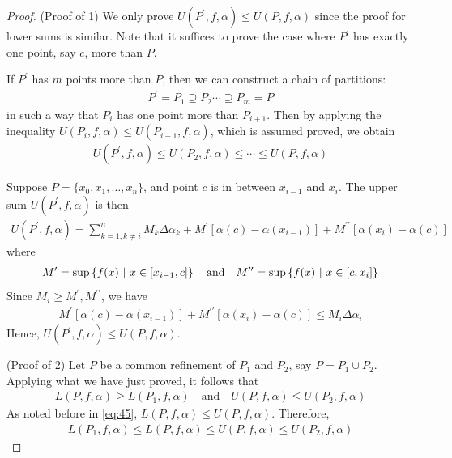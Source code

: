 \documentclass[thmcnt=section, 12pt]{my-elegantbook}
\begin{document}
\begin{proof}
    (Proof of 1) We only prove $U(P^\prime,f,\alpha) \leq U(P,f,\alpha)$ since the proof for lower sums is similar. Note that it suffices to prove the case where $P^\prime$ has exactly one point, say $c$, more than $P$.
    \begin{note}
        If $P^\prime$ has $m$ points more than $P$, then we can construct a chain of partitions:
        \begin{align*}
            P^\prime = P_1 \supseteq P_2 \cdots \supseteq P_m = P
        \end{align*}
        in such a way that $P_i$ has one point more than $P_{i+1}$. Then by applying the inequality $U(P_i,f,\alpha) \leq U(P_{i+1},f,\alpha)$, which is assumed proved, we obtain
        \begin{align*}
            U(P^\prime,f,\alpha) \leq U(P_2,f,\alpha) \leq \cdots \leq U(P,f,\alpha)
        \end{align*}
    \end{note}
    Suppose $P=\{x_0,x_1,\ldots,x_n\}$, and point $c$ is in between $x_{i-1}$ and $x_i$. The upper sum $U(P^\prime,f,\alpha)$ is then
    \begin{align*}
        U(P^\prime,f,\alpha)
        = \sum_{k=1, k \neq i}^n M_k \Delta \alpha_k
        + M^\prime[\alpha(c) - \alpha(x_{i-1})]
        + M^{\prime\prime}[\alpha(x_{i})-\alpha(c)]
    \end{align*}
    where
    \begin{align*}
        M^\prime = \sup\left\{ f(x) \ \middle| \ x \in [x_{i-1}, c] \right\}
        \quad\text{and}\quad
        M^{\prime\prime} = \sup\left\{ f(x) \ \middle| \ x \in [c, x_i] \right\}
    \end{align*}
    Since $M_i \geq M^\prime, M^{\prime\prime}$, we have
    \begin{align*}
        M^\prime[\alpha(c) - \alpha(x_{i-1})]
        + M^{\prime\prime}[\alpha(x_{i})-\alpha(c)]
        \leq M_i \Delta \alpha_i
    \end{align*}
    Hence, $U(P^\prime,f,\alpha) \leq U(P,f,\alpha)$.

    (Proof of 2) Let $P$ be a common refinement of $P_1$ and $P_2$, say $P = P_1 \cup P_2$. Applying what we have just proved, it follows that
    \begin{align*}
        L(P,f,\alpha) \geq L(P_1,f,\alpha)
        \quad \text{and} \quad
        U(P,f,\alpha) \leq U(P_2,f,\alpha)
    \end{align*}
    As noted before in \eqref{eq:45}, $L(P,f,\alpha) \leq U(P,f,\alpha)$. Therefore,
    \begin{align*}
        L(P_1,f,\alpha) \leq L(P,f,\alpha)
        \leq U(P,f,\alpha) \leq U(P_2,f,\alpha)
    \end{align*}
\end{proof}
\end{document}
